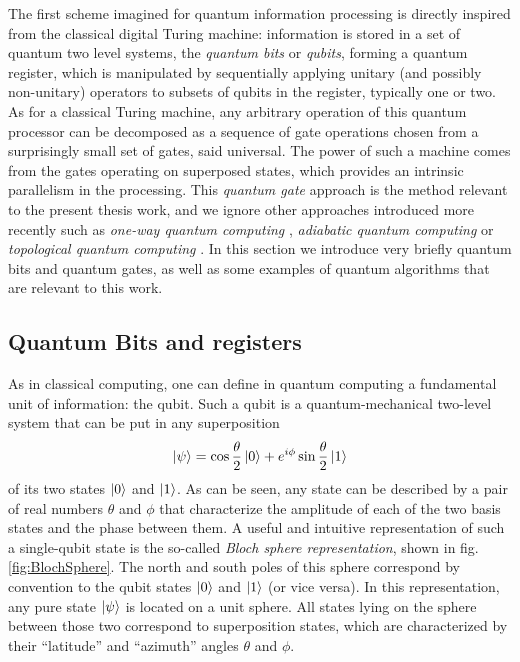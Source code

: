 The first scheme imagined for quantum information processing is directly inspired from the classical digital Turing machine: information is stored in a set of quantum two level systems, the {\it quantum bits} or {\it qubits}, forming a quantum register, which is manipulated by sequentially applying unitary (and possibly non-unitary) operators to subsets of qubits in the register, typically one or two. As for a classical Turing machine, any arbitrary operation of this quantum processor can be decomposed as a sequence of gate operations chosen from a surprisingly small set of gates, said universal. The power of such a machine comes from the gates operating on superposed states, which provides an intrinsic parallelism in the processing.
\smallskip
This {\it quantum gate} approach is the method relevant to the present thesis work, and we ignore other approaches introduced more recently such as {\it one-way quantum computing} \citep{raussendorf_one-way_2001}, {\it adiabatic quantum computing} \citep{farhi_quantum_2000} or {\it topological quantum computing} \citep{kitaev_fault-tolerant_2003}. In this section we introduce very briefly quantum bits and quantum gates, as well as some examples of quantum algorithms that are relevant to this work.


\subsection{Quantum Bits and registers}

As in classical computing, one can define in quantum computing a fundamental unit of information: the qubit. Such a qubit is a quantum-mechanical two-level system that can be put in any superposition
%
\begin{equation}
\left| \psi \right> = \cos{\frac{\theta}{2}}\left| 0 \right>+e^{i\phi}\sin{\frac{\theta}{2}}\left| 1 \right>
\end{equation}
%
of its two states $\left| 0 \right>$ and $\left| 1 \right>$.
As can be seen, any state can be described by a pair of real numbers $\theta$ and $\phi$ that characterize the amplitude of each of the two basis states and the phase between them. A useful and intuitive representation of such a single-qubit state is the so-called {\it Bloch sphere representation}, shown in fig. \ref{fig:BlochSphere}. The north and south poles of this sphere correspond by convention to the qubit states $\left| 0 \right>$ and $\left| 1 \right>$ (or vice versa). In this representation, any pure state $\left| \psi \right>$ is located on a unit sphere. All states lying on the sphere between those two correspond to superposition states, which are characterized by their ``latitude'' and ``azimuth'' angles $\theta$ and $\phi$. 

